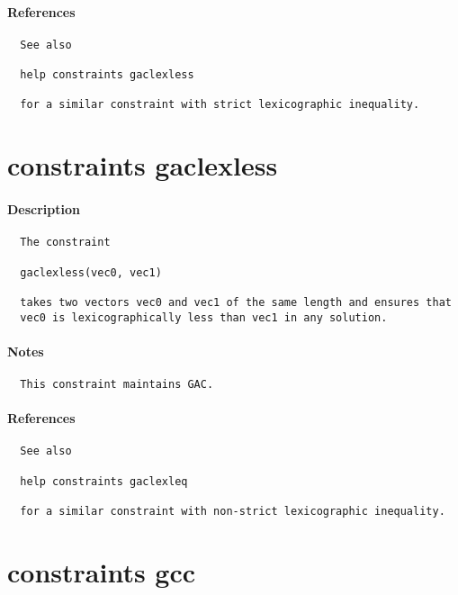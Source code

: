 \paragraph{References}
{\footnotesize
\begin{verbatim}
  See also

  help constraints gaclexless

  for a similar constraint with strict lexicographic inequality.
\end{verbatim}
}
\section{constraints gaclexless}
\paragraph{Description}
{\footnotesize
\begin{verbatim}
  The constraint

  gaclexless(vec0, vec1)

  takes two vectors vec0 and vec1 of the same length and ensures that
  vec0 is lexicographically less than vec1 in any solution.
\end{verbatim}
}
\paragraph{Notes}
{\footnotesize
\begin{verbatim}
  This constraint maintains GAC.
\end{verbatim}
}
\paragraph{References}
{\footnotesize
\begin{verbatim}
  See also

  help constraints gaclexleq

  for a similar constraint with non-strict lexicographic inequality.
\end{verbatim}
}
\section{constraints gcc}
